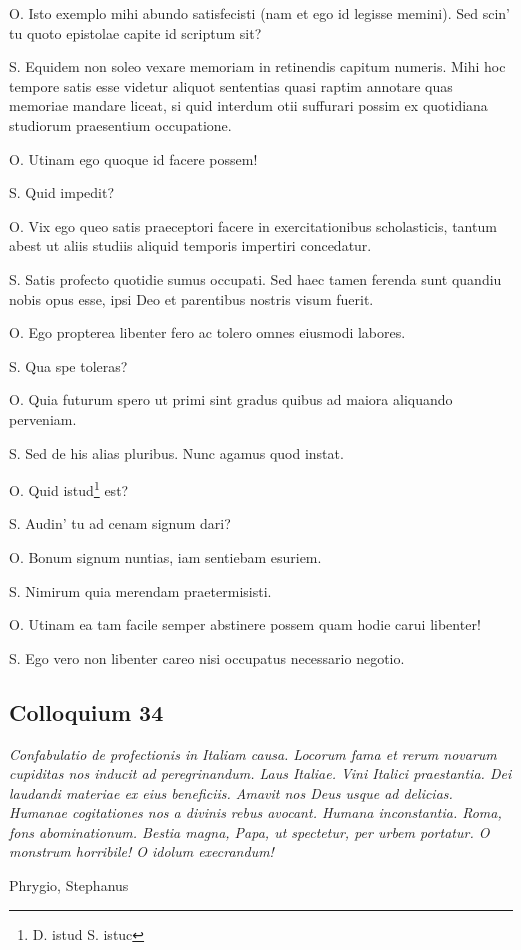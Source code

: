\documentclass{article}
\begin{document}
O. Isto exemplo mihi abundo satisfecisti (nam et ego id legisse memini). Sed scin’ tu quoto epistolae capite id scriptum sit?

S. Equidem non soleo vexare memoriam in retinendis capitum numeris. Mihi hoc tempore satis esse videtur aliquot sententias quasi raptim annotare quas memoriae mandare liceat, si quid interdum otii suffurari possim ex quotidiana studiorum praesentium occupatione.

O. Utinam ego quoque id facere possem!

S. Quid impedit?

O. Vix ego queo satis praeceptori facere in exercitationibus scholasticis, tantum abest ut aliis studiis aliquid temporis impertiri concedatur.

S. Satis profecto quotidie sumus occupati. Sed haec tamen ferenda sunt quandiu nobis opus esse, ipsi Deo et parentibus nostris visum fuerit.

O. Ego propterea libenter fero ac tolero omnes eiusmodi labores.

S. Qua spe toleras?

O. Quia futurum spero ut primi sint gradus quibus ad maiora aliquando perveniam.

S. Sed de his alias pluribus. Nunc agamus quod instat.

O. Quid istud\footnote{D. istud  S. istuc} est?

S. Audin' tu ad cenam signum dari?

O. Bonum signum nuntias, iam sentiebam esuriem.

S. Nimirum quia merendam praetermisisti.

O. Utinam ea tam facile semper abstinere possem quam hodie carui libenter!

S. Ego vero non libenter careo nisi occupatus necessario negotio.

\subsection{Colloquium 34}
\emph{Confabulatio de profectionis in Italiam causa. Locorum fama et rerum novarum cupiditas nos inducit ad peregrinandum. Laus Italiae. Vini Italici praestantia. Dei laudandi materiae ex eius beneficiis. Amavit nos Deus usque ad delicias. Humanae cogitationes nos a divinis rebus avocant. Humana inconstantia. Roma, fons abominationum. Bestia magna, Papa, ut spectetur, per urbem portatur. O monstrum horribile! O idolum execrandum!}

Phrygio, Stephanus
\end{document}
